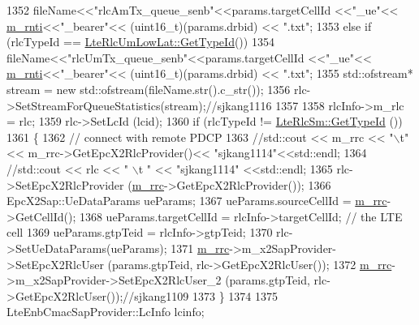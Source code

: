 \begin{DoxyCode}
1352                                           fileName<<\textcolor{stringliteral}{"rlcAmTx\_queue\_senb"}<<params.targetCellId <<\textcolor{stringliteral}{"\_ue"}<<
      \hyperlink{classns3_1_1UeManager_a5a72b4fe818f21993bd7f05d7e2c4f83}{m\_rnti}<<\textcolor{stringliteral}{"\_bearer"}<< (uint16\_t)(params.drbid) << \textcolor{stringliteral}{".txt"};
1353                             \textcolor{keywordflow}{else} \textcolor{keywordflow}{if} (rlcTypeId == \hyperlink{classns3_1_1LteRlcUmLowLat_afcbc09793556f00ce2cd62cb0c9c670b}{LteRlcUmLowLat::GetTypeId}())
1354                                             fileName<<\textcolor{stringliteral}{"rlcUmTx\_queue\_senb"}<<params.targetCellId <<\textcolor{stringliteral}{"\_ue"}<<
      \hyperlink{classns3_1_1UeManager_a5a72b4fe818f21993bd7f05d7e2c4f83}{m\_rnti}<<\textcolor{stringliteral}{"\_bearer"}<< (uint16\_t)(params.drbid) << \textcolor{stringliteral}{".txt"};
1355                                                                         std::ofstream* stream = \textcolor{keyword}{new} 
      std::ofstream(fileName.str().c\_str());
1356                    rlc->SetStreamForQueueStatistics(stream);\textcolor{comment}{//sjkang1116}
1357 
1358     rlcInfo->m\_rlc = rlc;
1359     rlc->SetLcId (lcid);
1360     \textcolor{keywordflow}{if} (rlcTypeId != \hyperlink{classns3_1_1LteRlcSm_a160bd39ce4e0d113dd5d93cc3a258045}{LteRlcSm::GetTypeId} ())
1361     \{
1362       \textcolor{comment}{// connect with remote PDCP}
1363         \textcolor{comment}{//std::cout << m\_rrc << "\(\backslash\)t"<< m\_rrc->GetEpcX2RlcProvider()<< "sjkang1114"<<std::endl;}
1364         \textcolor{comment}{//std::cout << rlc << " \(\backslash\)t " << "sjkang1114" <<std::endl;}
1365       rlc->SetEpcX2RlcProvider (\hyperlink{classns3_1_1UeManager_ab4405e9f354c66e7c1a4c95832290f5b}{m\_rrc}->GetEpcX2RlcProvider());
1366       EpcX2Sap::UeDataParams ueParams;
1367       ueParams.sourceCellId = \hyperlink{classns3_1_1UeManager_ab4405e9f354c66e7c1a4c95832290f5b}{m\_rrc}->GetCellId();
1368       ueParams.targetCellId = rlcInfo->targetCellId; \textcolor{comment}{// the LTE cell}
1369       ueParams.gtpTeid = rlcInfo->gtpTeid;
1370       rlc->SetUeDataParams(ueParams);
1371       \hyperlink{classns3_1_1UeManager_ab4405e9f354c66e7c1a4c95832290f5b}{m\_rrc}->m\_x2SapProvider->SetEpcX2RlcUser (params.gtpTeid, rlc->GetEpcX2RlcUser());
1372       \hyperlink{classns3_1_1UeManager_ab4405e9f354c66e7c1a4c95832290f5b}{m\_rrc}->m\_x2SapProvider->SetEpcX2RlcUser\_2 (params.gtpTeid, rlc->GetEpcX2RlcUser());\textcolor{comment}{//sjkang1109}
1373     \}
1374 
1375     LteEnbCmacSapProvider::LcInfo lcinfo;

\end{DoxyCode}

